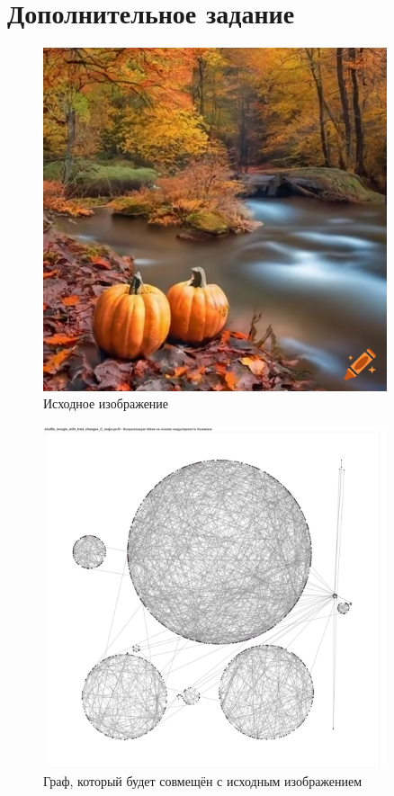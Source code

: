 \documentclass[a4paper,oneside,14pt]{extarticle}
\begin{document}
\section{Дополнительное задание}

\begin{figure}[H]
	\centering
	\includegraphics[width=0.9\textwidth]{img/source-pic.png}
	\caption{Исходное изображение}
	\label{fig:}
\end{figure}

\begin{figure}[H]
	\centering
	\includegraphics[width=0.9\textwidth]{img/boogiewoogie-newmann.pdf}
	\caption{Граф, который будет совмещён с исходным изображением}
	\label{fig:}
\end{figure}
\end{document}
